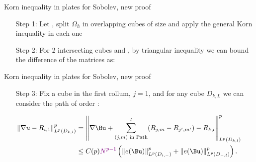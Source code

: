 \documentclass{beamer}
\begin{document}
\begin{frame}{ Korn inequality in plates for Sobolev, new proof}
    
    \begin{itemize}[leftmargin = 1.5cm]
     \item[Step 1:] Let , split $\Omega_h$ in   overlapping cubes of size  and apply the general Korn inequality in each one
    \vfill\pause
    \item[Step 2:] For 2 intersecting cubes  and , by triangular inequality we can bound the difference of the matrices as:
    \end{itemize}
\end{frame}
\begin{frame}{ Korn inequality in plates for Sobolev, new proof}
    \begin{itemize}[leftmargin = 1.5cm]
        \item[Step 3:]Fix a cube in the first collum, $j=1$, and for any cube $D_{k,L}$ we can consider the path of order :
        
        
    \end{itemize}
    \begin{align*}
        \|\nabla u- R_{i,1}\|^p_{L^p(D_{k,l})} &= \left\|\nabla \Bu+ \sum_{(j,m)\text{ in Path}}^l (R_{j,m}-R_{j',m'})-R_{k,l}\right\|^p_{L^p(D_{k,l})}
        \\
        &\leq C(p)  \textcolor{violet}{N^{p-1}}\left(\|e(\Bu)\|^p_{L^p(D_{i,-})}+\|e(\Bu)\|^p_{L^p(D_{-,l})}\right).
        \end{align*}
\end{frame}
\end{document}

